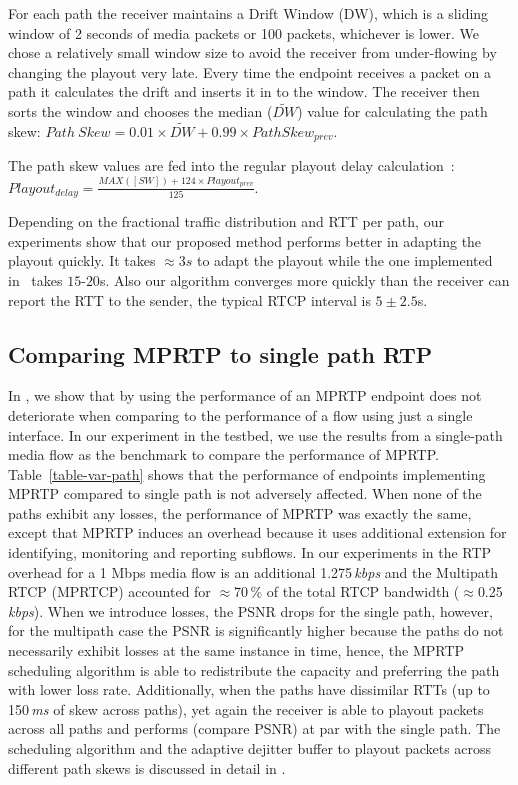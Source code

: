 For each path the receiver maintains a Drift Window (DW), which is a sliding
window of 2 seconds of media packets or 100 packets, whichever is lower. We
chose a relatively small window size to avoid the receiver from under-flowing
by changing the playout very late. Every time the endpoint receives a packet
on a path it calculates the drift and inserts it in to the window. The
receiver then sorts the window and chooses the median ($\widetilde{DW}$) value
for calculating the path skew: $Path\ Skew = 0.01 \times \widetilde{DW} + 0.99
\times PathSkew_{prev}$. 

The path skew values are fed into the regular playout delay
calculation~\cite{Fober05,Colin03}: $Playout_{delay} = \frac{MAX([SW]) + 124
\times Playout_{prev}}{125}$.

Depending on the fractional traffic distribution and RTT per path, our
experiments show that our proposed method performs better in adapting the
playout quickly. It takes $\approx 3s$ to adapt the playout while the one
implemented in~\cite{Fober05,Colin03} takes $15$-$20$s. Also our algorithm
converges more quickly than the receiver can report the RTT to the sender, the
typical RTCP interval is $5\pm2.5$s.

\subsection{Comparing MPRTP to single path RTP}

In , we show that by using the performance of an MPRTP
endpoint does not deteriorate when comparing to the performance of a flow
using just a single interface. In our experiment in the testbed, we use the
results from a single-path media flow as the benchmark to compare the
performance of MPRTP. Table~\ref{table-var-path} shows that the performance of
endpoints implementing MPRTP compared to single path is not adversely
affected. When none of the paths exhibit any losses, the performance of MPRTP
was exactly the same, except that MPRTP induces an overhead because it uses
additional extension for identifying, monitoring and reporting subflows. In
our experiments in  the RTP overhead for a 1 Mbps media flow
is an additional 1.275\,\emph{kbps} and the Multipath RTCP (MPRTCP) accounted
for $\approx$70\,\% of the total RTCP bandwidth ($\approx$0.25\,\emph{kbps}).
When we introduce losses, the PSNR drops for the single path, however, for the
multipath case the PSNR is significantly higher because the paths do not
necessarily exhibit losses at the same instance in time, hence, the MPRTP
scheduling algorithm is able to redistribute the capacity and preferring the
path with lower loss rate. Additionally, when the paths have dissimilar RTTs
(up to 150\,\emph{ms} of skew across paths), yet again the receiver is able to
playout packets across all paths and performs (compare PSNR) at par with the
single path. The scheduling algorithm and the adaptive dejitter buffer to
playout packets across different path skews is discussed in detail in
.

